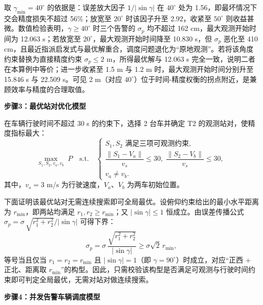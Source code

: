 取 $\gamma_{\min}=40^\circ$ 的依据是：误差放大因子 $1/\lvert\sin\gamma\rvert$ 在 $40^\circ$ 处为 1.56，即最坏情况下交会精度损失不超过 56\%；放宽至 $20^\circ$ 时该因子升至 2.92，收紧至 $50^\circ$ 则收益甚微。数值检验表明，$\gamma\ge40^\circ$ 时三个告警的 $\sigma_p$ 均不超过 162 cm，最大观测开始时间为 12.063 s；若放宽至 $20^\circ$，最大观测开始时间降至 10.830 s，但 $\sigma_p$ 恶化至 410 cm，且最近指派启发式与最优解重合，调度问题退化为“原地观测”。若将该角度约束替换为直接精度约束 $\sigma_p\le2$ m，所得最优解与 12.063 s 完全一致，说明二者在本算例中等价；进一步收紧至 1.5 m 与 1.2 m 时，最大观测开始时间分别升至 15.846 s 与 22.509 s。可见 2 m（对应 $40^\circ$）位于时间-精度权衡的拐点附近，是兼顾效率与精度的合理取值。

\textbf{步骤3：最优站对优化模型}

在车辆行驶时间不超过 30 s 的约束下，选择 2 台车并确定 T2 的观测站对，使精度指标最大：
\begin{equation}
    \max_{S_1,S_2,v_a,v_b} \; P \quad \text{s.t.} \quad
    \begin{cases}
    S_1,S_2 \text{ 满足三项可观测约束},\\
    \dfrac{\lVert S_1-V_a\rVert}{v_s}\le 30,\; \dfrac{\lVert S_2-V_b\rVert}{v_s}\le 30,\\
    v_a\neq v_b .
    \end{cases}
\end{equation}
其中，$v_s=3$ m/s 为行驶速度，$V_a$、$V_b$ 为两车初始位置。

下面证明该最优站对无需连续搜索即可全局最优。设俯仰约束给出的最小水平距离为 $r_{\min}$，即两站均满足 $r_1,r_2\ge r_{\min}$；又 $\lvert\sin\gamma\rvert\le 1$ 恒成立。由误差传播公式 $\sigma_p=\sigma\,\sqrt{r_1^2+r_2^2}/\lvert\sin\gamma\rvert$ 可得下界：
\begin{equation}
    \sigma_p=\sigma\,\frac{\sqrt{r_1^2+r_2^2}}{\lvert\sin\gamma\rvert}\ge \sigma\sqrt{2}\,r_{\min},
\end{equation}
等号当且仅当 $r_1=r_2=r_{\min}$ 且 $\lvert\sin\gamma\rvert=1$（即 $\gamma=90^\circ$）时成立，对应“正西 + 正北、距离取 $r_{\min}$”的构型。因此，只需校验该构型是否满足可观测与行驶时间约束即可判定全局最优，无需对站对做连续搜索。

\textbf{步骤4：并发告警车辆调度模型}

